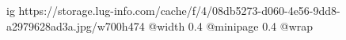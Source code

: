  
 
 
 
 

\ifcmt
  ig https://storage.lug-info.com/cache/f/4/08db5273-d060-4e56-9dd8-a2979628ad3a.jpg/w700h474%
  @width 0.4
  @minipage 0.4
  @wrap \parpic[r]
\fi
